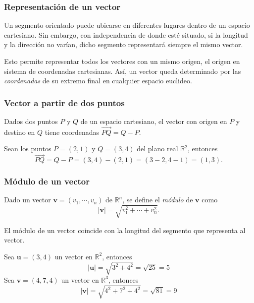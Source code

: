 \begin{frame}
\frametitle{Representación de un vector}
Un segmento orientado puede ubicarse en diferentes lugares dentro de un espacio cartesiano. 
Sin embargo, con independencia de donde esté situado, si la longitud y la dirección no varían, dicho segmento
representará siempre el mismo vector.

Esto permite representar todos los vectores con un mismo origen, el origen en sistema de coordenadas cartesianas.
Así, un vector queda determinado por las \emph{coordenadas} de su extremo final en cualquier espacio euclideo.

\begin{center}
\scalebox{0.8}{}
\end{center}
\end{frame} 


\begin{frame}
\frametitle{Vector a partir de dos puntos}
Dados dos puntos $P$ y $Q$ de un espacio cartesiano, el vector con origen en $P$ y destino en $Q$ tiene coordenadas $\vec{PQ}=Q-P$.

Sean los puntos $P=(2,1)$  y $Q=(3,4)$ del plano real $\mathbb{R}^2$, entonces
\[
\vec{PQ} = Q-P = (3,4)-(2,1) = (3-2,4-1) = (1,3).
\]
\begin{center}
\scalebox{0.8}{}
\end{center}
\end{frame} 


\begin{frame}
\frametitle{Módulo de un vector}
\begin{definicion}
Dado un vector $\mathbf{v}=(v_1,\cdots,v_n)$ de $\mathbb{R}^n$, se define el \emph{módulo} de $\mathbf{v}$ como
\[
|\mathbf{v}| = \sqrt{v_1^2+ \cdots + v_n^2}.
\]
\end{definicion}
El módulo de un vector coincide con la longitud del segmento que representa al vector.

Sea $\mathbf{u}=(3,4)$ un vector en $\mathbb{R}^2$, entonces
\[
|\mathbf{u}| = \sqrt{3^2+4^2} = \sqrt{25} = 5
\]
Sea $\mathbf{v}=(4,7,4)$ un vector en $\mathbb{R}^3$, entonces
\[
|\mathbf{v}| = \sqrt{4^2+7^2+4^2} = \sqrt{81} = 9
\]
\end{frame} 



